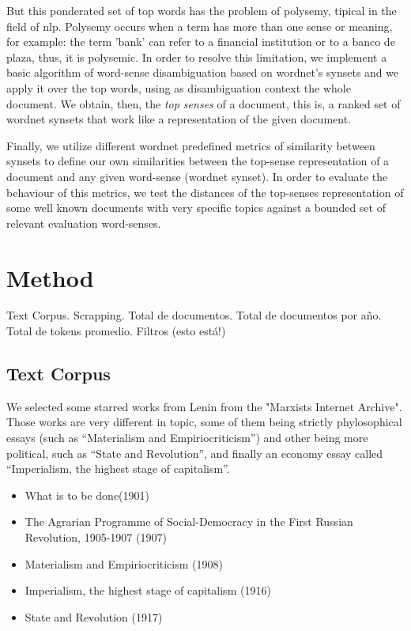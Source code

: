 \documentclass{pnastwo}
\begin{document}
\begin{article}
But this ponderated set of top words has the problem of polysemy, tipical in the field of nlp. Polysemy occurs when a term has more than one sense or meaning, for example: the term 'bank' can refer to a financial institution or to a {\color{red}banco de plaza}, thus, it is polysemic. In order to resolve this limitation, we implement a basic algorithm of word-sense disambiguation based on wordnet's synsets and we apply it over the top words, using as disambiguation context the whole document. We obtain, then, the \textit{top senses} of a document, this is, a ranked set of wordnet synsets that work like a representation of the given document. 

Finally, we utilize different wordnet predefined metrics of similarity between synsets to define our own similarities between the top-sense representation of a document and any given word-sense (wordnet synset). In order to evaluate the behaviour of this metrics, we test the distances of the top-senses representation of some well known documents with very specific topics against a bounded set of relevant evaluation word-senses. 


\section{Method}
Text Corpus.  Scrapping. Total de documentos. Total de documentos por año. Total de tokens promedio. Filtros (esto está!)
\subsection{Text Corpus}

We selected some starred works from Lenin from the "Marxists Internet Archive"\cite{LENIN}. Those works are very different in topic, some of them being strictly phylosophical essays (such as ``Materialism and Empiriocriticism'') and other being more political, such as ``State and Revolution'', and finally an economy essay called ``Imperialism, the highest stage of capitalism''. 

\begin{itemize}
  \item What is to be done(1901)
  \item The Agrarian Programme of Social-Democracy in the First Russian Revolution, 1905-1907 (1907)
  \item Materialism and Empiriocriticism (1908)
  \item Imperialism, the highest stage of capitalism (1916)
  \item State and Revolution (1917)
\end{itemize}


\end{article}
\end{document}
